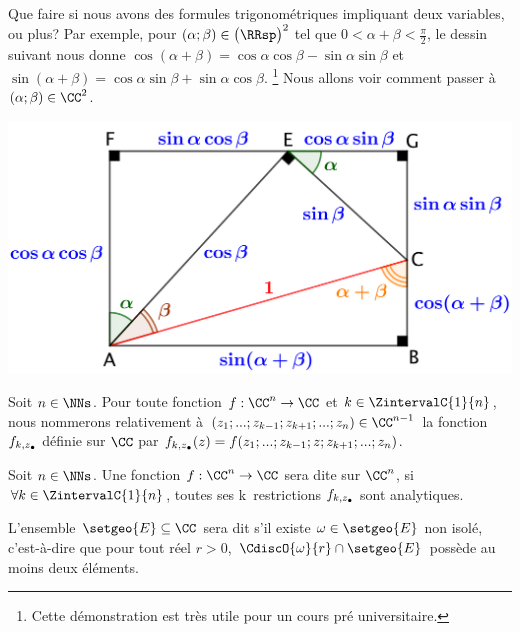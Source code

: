 Que faire si nous avons des formules trigonométriques impliquant deux variables, ou plus?
Par exemple,
pour
$(\alpha ; \beta) \in \big( \RRsp \big)^2$ tel que $0 < \alpha + \beta < \frac{\pi}{2}$,
le dessin suivant nous donne
$\cos(\alpha + \beta) = \cos \alpha \cos \beta - \sin \alpha \sin \beta$
et
$\sin(\alpha + \beta) = \cos \alpha \sin \beta + \sin \alpha \cos \beta$.%
\footnote{
    Cette démonstration est très utile pour un cours pré universitaire.
}
Nous allons voir comment passer à $(\alpha ; \beta) \in \CC^2$.


\begin{center}
	\includegraphics[scale=.7]{add-trigo-formulas.png}
\end{center}




\begin{defi}
    Soit $n \in \NNs$.
    Pour toute fonction $f: \CC^n \rightarrow \CC$
    et
    $k \in \ZintervalC{1}{n}$,
    nous nommerons  relativement à $(z_1 ; ... ; z_{k-1} ; z_{k+1} ; ... ; z_n) \in \CC^{n-1}$ 
    la fonction $f_{k , z_{\small\bullet}}$ définie sur $\CC$ par
    $f_{k , z_{\small\bullet}}(z) = f(z_1 ; ... ; z_{k-1} ; z ; z_{k+1} ; ... ; z_n)$.
\end{defi}


\begin{defi}
    Soit $n \in \NNs$.
    Une fonction $f: \CC^n \rightarrow \CC$ sera dite  sur $\CC^n$,
    si $\forall k \in \ZintervalC{1}{n}$,
    toutes ses k\iemes\ restrictions $f_{k , z_{\small\bullet}}$ sont analytiques.
\end{defi}


\begin{defi}
    L'ensemble $\setgeo{E} \subseteq \CC$ sera dit  
    s'il existe $\omega \in \setgeo{E}$ non isolé,
    c'est-à-dire
    que pour tout réel $r > 0$,
    $\CdiscO{\omega}{r} \cap \setgeo{E}$ possède au moins deux éléments.
\end{defi}


